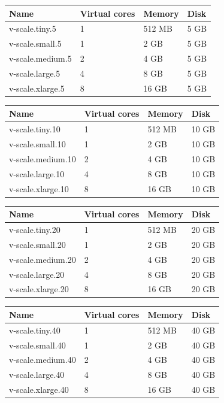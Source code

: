 \documentclass[letterpaper,10pt,english]{sphinxmanual}
\begin{document}
\begin{tabulary}{\linewidth}{|L|L|L|L|}
\hline
\textsf{\relax 
Name
} & \textsf{\relax 
Virtual cores
} & \textsf{\relax 
Memory
} & \textsf{\relax 
Disk
}\\
\hline
v-scale.tiny.5
 & 
1
 & 
512 MB
 & 
5 GB
\\
\hline
v-scale.small.5
 & 
1
 & 
2 GB
 & 
5 GB
\\
\hline
v-scale.medium.5
 & 
2
 & 
4 GB
 & 
5 GB
\\
\hline
v-scale.large.5
 & 
4
 & 
8 GB
 & 
5 GB
\\
\hline
v-scale.xlarge.5
 & 
8
 & 
16 GB
 & 
5 GB
\\
\hline\end{tabulary}


\begin{tabulary}{\linewidth}{|L|L|L|L|}
\hline
\textsf{\relax 
Name
} & \textsf{\relax 
Virtual cores
} & \textsf{\relax 
Memory
} & \textsf{\relax 
Disk
}\\
\hline
v-scale.tiny.10
 & 
1
 & 
512 MB
 & 
10 GB
\\
\hline
v-scale.small.10
 & 
1
 & 
2 GB
 & 
10 GB
\\
\hline
v-scale.medium.10
 & 
2
 & 
4 GB
 & 
10 GB
\\
\hline
v-scale.large.10
 & 
4
 & 
8 GB
 & 
10 GB
\\
\hline
v-scale.xlarge.10
 & 
8
 & 
16 GB
 & 
10 GB
\\
\hline\end{tabulary}


\begin{tabulary}{\linewidth}{|L|L|L|L|}
\hline
\textsf{\relax 
Name
} & \textsf{\relax 
Virtual cores
} & \textsf{\relax 
Memory
} & \textsf{\relax 
Disk
}\\
\hline
v-scale.tiny.20
 & 
1
 & 
512 MB
 & 
20 GB
\\
\hline
v-scale.small.20
 & 
1
 & 
2 GB
 & 
20 GB
\\
\hline
v-scale.medium.20
 & 
2
 & 
4 GB
 & 
20 GB
\\
\hline
v-scale.large.20
 & 
4
 & 
8 GB
 & 
20 GB
\\
\hline
v-scale.xlarge.20
 & 
8
 & 
16 GB
 & 
20 GB
\\
\hline\end{tabulary}


\begin{tabulary}{\linewidth}{|L|L|L|L|}
\hline
\textsf{\relax 
Name
} & \textsf{\relax 
Virtual cores
} & \textsf{\relax 
Memory
} & \textsf{\relax 
Disk
}\\
\hline
v-scale.tiny.40
 & 
1
 & 
512 MB
 & 
40 GB
\\
\hline
v-scale.small.40
 & 
1
 & 
2 GB
 & 
40 GB
\\
\hline
v-scale.medium.40
 & 
2
 & 
4 GB
 & 
40 GB
\\
\hline
v-scale.large.40
 & 
4
 & 
8 GB
 & 
40 GB
\\
\hline
v-scale.xlarge.40
 & 
8
 & 
16 GB
 & 
40 GB
\\
\hline\end{tabulary}
\end{document}
